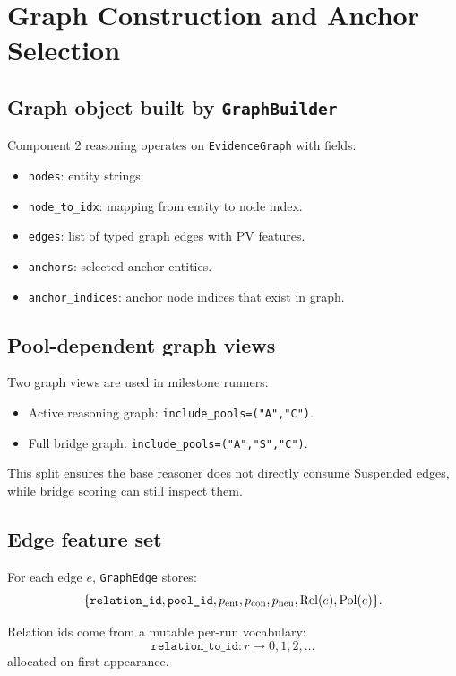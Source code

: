\section{Graph Construction and Anchor Selection}
\label{sec:graph-anchors}

\subsection{Graph object built by \texttt{GraphBuilder}}
Component 2 reasoning operates on \texttt{EvidenceGraph} with fields:
\begin{itemize}
\item \texttt{nodes}: entity strings.
\item \texttt{node\_to\_idx}: mapping from entity to node index.
\item \texttt{edges}: list of typed graph edges with PV features.
\item \texttt{anchors}: selected anchor entities.
\item \texttt{anchor\_indices}: anchor node indices that exist in graph.
\end{itemize}

\subsection{Pool-dependent graph views}
Two graph views are used in milestone runners:
\begin{itemize}
\item Active reasoning graph: \texttt{include\_pools=("A","C")}.
\item Full bridge graph: \texttt{include\_pools=("A","S","C")}.
\end{itemize}
This split ensures the base reasoner does not directly consume Suspended edges, while bridge scoring can still inspect them.

\subsection{Edge feature set}
For each edge $e$, \texttt{GraphEdge} stores:
\[
\{\texttt{relation\_id},\texttt{pool\_id},p_{\text{ent}},p_{\text{con}},p_{\text{neu}},\operatorname{Rel}(e),\operatorname{Pol}(e)\}.
\]

Relation ids come from a mutable per-run vocabulary:
\[
\texttt{relation\_to\_id}: r \mapsto 0,1,2,\dots
\]
allocated on first appearance.

